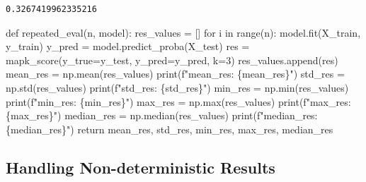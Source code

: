 \documentclass[
  letterpaper,
  DIV=11,
  numbers=noendperiod]{scrreprt}
\newenvironment{Shaded}{\begin{snugshade}}{\end{snugshade}}
\newcommand{\BuiltInTok}[1]{\textcolor[rgb]{0.00,0.23,0.31}{#1}}
\newcommand{\ControlFlowTok}[1]{\textcolor[rgb]{0.00,0.23,0.31}{#1}}
\newcommand{\DecValTok}[1]{\textcolor[rgb]{0.68,0.00,0.00}{#1}}
\newcommand{\KeywordTok}[1]{\textcolor[rgb]{0.00,0.23,0.31}{#1}}
\newcommand{\NormalTok}[1]{\textcolor[rgb]{0.00,0.23,0.31}{#1}}
\newcommand{\OperatorTok}[1]{\textcolor[rgb]{0.37,0.37,0.37}{#1}}
\newcommand{\SpecialCharTok}[1]{\textcolor[rgb]{0.37,0.37,0.37}{#1}}
\newcommand{\SpecialStringTok}[1]{\textcolor[rgb]{0.13,0.47,0.30}{#1}}
\begin{document}
\begin{verbatim}
0.3267419962335216
\end{verbatim}

\begin{Shaded}
\begin{Highlighting}[]
\KeywordTok{def}\NormalTok{ repeated\_eval(n, model):}
\NormalTok{    res\_values }\OperatorTok{=}\NormalTok{ []}
    \ControlFlowTok{for}\NormalTok{ i }\KeywordTok{in} \BuiltInTok{range}\NormalTok{(n):}
\NormalTok{        model.fit(X\_train, y\_train)}
\NormalTok{        y\_pred }\OperatorTok{=}\NormalTok{ model.predict\_proba(X\_test)}
\NormalTok{        res }\OperatorTok{=}\NormalTok{ mapk\_score(y\_true}\OperatorTok{=}\NormalTok{y\_test, y\_pred}\OperatorTok{=}\NormalTok{y\_pred, k}\OperatorTok{=}\DecValTok{3}\NormalTok{)}
\NormalTok{        res\_values.append(res)}
\NormalTok{    mean\_res }\OperatorTok{=}\NormalTok{ np.mean(res\_values)}
    \BuiltInTok{print}\NormalTok{(}\SpecialStringTok{f"mean\_res: }\SpecialCharTok{\{}\NormalTok{mean\_res}\SpecialCharTok{\}}\SpecialStringTok{"}\NormalTok{)}
\NormalTok{    std\_res }\OperatorTok{=}\NormalTok{ np.std(res\_values)}
    \BuiltInTok{print}\NormalTok{(}\SpecialStringTok{f"std\_res: }\SpecialCharTok{\{}\NormalTok{std\_res}\SpecialCharTok{\}}\SpecialStringTok{"}\NormalTok{)}
\NormalTok{    min\_res }\OperatorTok{=}\NormalTok{ np.}\BuiltInTok{min}\NormalTok{(res\_values)}
    \BuiltInTok{print}\NormalTok{(}\SpecialStringTok{f"min\_res: }\SpecialCharTok{\{}\NormalTok{min\_res}\SpecialCharTok{\}}\SpecialStringTok{"}\NormalTok{)}
\NormalTok{    max\_res }\OperatorTok{=}\NormalTok{ np.}\BuiltInTok{max}\NormalTok{(res\_values)}
    \BuiltInTok{print}\NormalTok{(}\SpecialStringTok{f"max\_res: }\SpecialCharTok{\{}\NormalTok{max\_res}\SpecialCharTok{\}}\SpecialStringTok{"}\NormalTok{)}
\NormalTok{    median\_res }\OperatorTok{=}\NormalTok{ np.median(res\_values)}
    \BuiltInTok{print}\NormalTok{(}\SpecialStringTok{f"median\_res: }\SpecialCharTok{\{}\NormalTok{median\_res}\SpecialCharTok{\}}\SpecialStringTok{"}\NormalTok{)}
    \ControlFlowTok{return}\NormalTok{ mean\_res, std\_res, min\_res, max\_res, median\_res}
\end{Highlighting}
\end{Shaded}

\hypertarget{handling-non-deterministic-results-3}{%
\subsection{Handling Non-deterministic
Results}\label{handling-non-deterministic-results-3}}
\end{document}
